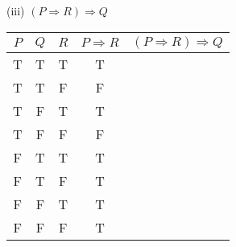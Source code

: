 \documentclass{article}
\begin{document}
(iii) $(P \Rightarrow R) \Rightarrow Q$\\
\begin{tabular}{|c|c|c|c|c|}
    \hline
    $P$ & $Q$ & $R$ &$P \Rightarrow R$& $(P \Rightarrow R) \Rightarrow Q$ \\
    \hline
    T   & T   & T   &   T                                \\
    T   & T   & F   &   F                                \\
    T   & F   & T   &    T                               \\
    T   & F   & F   &    F                               \\
    F   & T   & T   &     T                              \\
    F   & T   & F   &      T                             \\
    F   & F   & T   &       T                            \\
    F   & F   & F   &        T                           \\
    \hline
\end{tabular}
\end{document}
